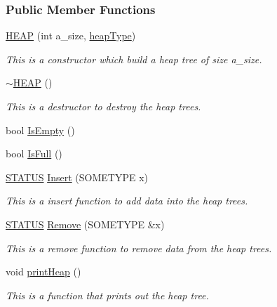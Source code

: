 \subsubsection*{Public Member Functions}
\begin{DoxyCompactItemize}
\item 
\hyperlink{classHEAP_a341e0d88f79b41d55f804b759646d13c}{H\+E\+A\+P} (int a\+\_\+size, \hyperlink{classHEAP_a440ecc6b7771102dbaa63b3dacce6c27}{heap\+Type})
\begin{DoxyCompactList}\small\item\em This is a constructor which build a heap tree of size a\+\_\+size. \end{DoxyCompactList}\item 
\hyperlink{classHEAP_a7a99ff54ff586bbee33e36828bb7a2f7}{$\sim$\+H\+E\+A\+P} ()
\begin{DoxyCompactList}\small\item\em This is a destructor to destroy the heap trees. \end{DoxyCompactList}\item 
bool \hyperlink{classHEAP_a560500cc8aa1dc1d07dbc4e6c4d1b5f3}{Is\+Empty} ()
\item 
bool \hyperlink{classHEAP_ac2560a1c0edc4cecc583880fe6006a91}{Is\+Full} ()
\item 
\hyperlink{HEAP_8H_a32c27cc471df37f4fc818d65de0a56c4}{S\+T\+A\+T\+U\+S} \hyperlink{classHEAP_a61daf2c080cdb92947a0e591fbd8d772}{Insert} (S\+O\+M\+E\+T\+Y\+P\+E x)
\begin{DoxyCompactList}\small\item\em This is a insert function to add data into the heap trees. \end{DoxyCompactList}\item 
\hyperlink{HEAP_8H_a32c27cc471df37f4fc818d65de0a56c4}{S\+T\+A\+T\+U\+S} \hyperlink{classHEAP_aedf7ac5c115a4d0bb96139da8788f26a}{Remove} (S\+O\+M\+E\+T\+Y\+P\+E \&x)
\begin{DoxyCompactList}\small\item\em This is a remove function to remove data from the heap trees. \end{DoxyCompactList}\item 
void \hyperlink{classHEAP_a07fcd2f8486f24a64f216a7c2bfdbf77}{print\+Heap} ()
\begin{DoxyCompactList}\small\item\em This is a function that prints out the heap tree. \end{DoxyCompactList}\item 

\end{DoxyCompactItemize}

